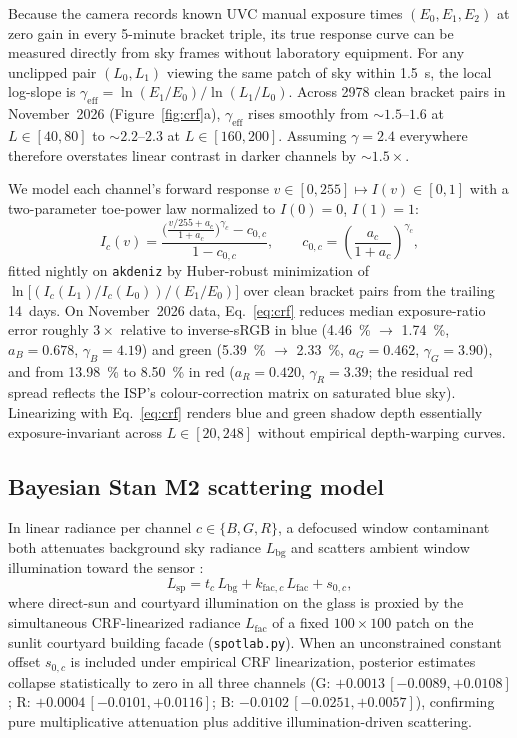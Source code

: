 \documentclass[11pt,a4paper]{article}
\newcommand{\Lbg}{L_{\mathrm{bg}}}
\newcommand{\Lsp}{L_{\mathrm{sp}}}
\newcommand{\Lfac}{L_{\mathrm{fac}}}
\newcommand{\code}[1]{\texttt{\small #1}}
\begin{document}
Because the camera records known UVC manual exposure times $(E_0, E_1, E_2)$ at zero
gain in every 5-minute bracket triple, its true response curve can be measured directly
from sky frames without laboratory equipment. For any unclipped pair $(L_0, L_1)$
viewing the same patch of sky within \SI{1.5}{s}, the local log-slope is
$\gamma_{\mathrm{eff}} = \ln(E_1/E_0)/\ln(L_1/L_0)$. Across \num{2978} clean bracket
pairs in November~2026 (Figure~\ref{fig:crf}a), $\gamma_{\mathrm{eff}}$ rises smoothly
from $\sim 1.5$--$1.6$ at $L \in [40, 80]$ to $\sim 2.2$--$2.3$ at $L \in [160, 200]$.
Assuming $\gamma = 2.4$ everywhere therefore overstates linear contrast in darker
channels by $\sim 1.5\times$.

We model each channel's forward response $v \in [0, 255] \mapsto I(v) \in [0, 1]$ with a
two-parameter toe-power law normalized to $I(0)=0$, $I(1)=1$:
\begin{equation}
  I_c(v) = \frac{\bigl(\frac{v/255 + a_c}{1 + a_c}\bigr)^{\gamma_c} - c_{0,c}}{1 - c_{0,c}},
  \qquad c_{0,c} = \left(\frac{a_c}{1 + a_c}\right)^{\gamma_c},
  \label{eq:crf}
\end{equation}
fitted nightly on \code{akdeniz} by Huber-robust minimization of
$\ln\bigl[(I_c(L_1)/I_c(L_0)) / (E_1/E_0)\bigr]$ over clean bracket pairs from the
trailing 14~days. On November~2026 data, Eq.~\eqref{eq:crf} reduces median
exposure-ratio error roughly $3\times$ relative to inverse-sRGB in blue
(\SI{4.46}{\percent} $\to$ \SI{1.74}{\percent}, $a_B = 0.678$, $\gamma_B = 4.19$) and
green (\SI{5.39}{\percent} $\to$ \SI{2.33}{\percent}, $a_G = 0.462$, $\gamma_G = 3.90$),
and from \SI{13.98}{\percent} to \SI{8.50}{\percent} in red ($a_R = 0.420$,
$\gamma_R = 3.39$; the residual red spread reflects the ISP's colour-correction matrix
on saturated blue sky). Linearizing with Eq.~\eqref{eq:crf} renders blue and green
shadow depth essentially exposure-invariant across $L \in [20, 248]$ without empirical
depth-warping curves.

\subsection{Bayesian Stan M2 scattering model}
\label{sec:bayes}

In linear radiance per channel $c \in \{B, G, R\}$, a defocused window contaminant both
attenuates background sky radiance $\Lbg$ and scatters ambient window illumination
toward the sensor \citep{gu2009dirty}:
\begin{equation}
  \Lsp = t_c\,\Lbg + k_{\mathrm{fac},c}\,\Lfac + s_{0,c},
  \label{eq:m2}
\end{equation}
where direct-sun and courtyard illumination on the glass is proxied by the simultaneous
CRF-linearized radiance $\Lfac$ of a fixed $100\times 100$ patch on the sunlit
courtyard building facade (\code{spotlab.py}). When an unconstrained constant offset
$s_{0,c}$ is included under empirical CRF linearization, posterior estimates collapse
statistically to zero in all three channels (G: $+0.0013\,[-0.0089, +0.0108]$;
R: $+0.0004\,[-0.0101, +0.0116]$; B: $-0.0102\,[-0.0251, +0.0057]$), confirming pure
multiplicative attenuation plus additive illumination-driven scattering.
\end{document}
